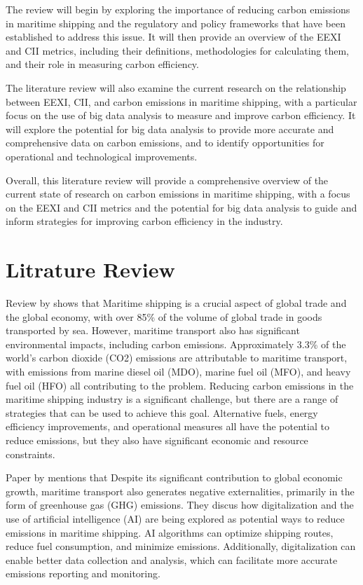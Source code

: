 The review will begin by exploring the importance of reducing carbon emissions in maritime shipping and the regulatory and policy frameworks that have been established to address this issue. It will then provide an overview of the EEXI and CII metrics, including their definitions, methodologies for calculating them, and their role in measuring carbon efficiency.

The literature review will also examine the current research on the relationship between EEXI, CII, and carbon emissions in maritime shipping, with a particular focus on the use of big data analysis to measure and improve carbon efficiency. It will explore the potential for big data analysis to provide more accurate and comprehensive data on carbon emissions, and to identify opportunities for operational and technological improvements.

Overall, this literature review will provide a comprehensive overview of the current state of research on carbon emissions in maritime shipping, with a focus on the EEXI and CII metrics and the potential for big data analysis to guide and inform strategies for improving carbon efficiency in the industry.


\section{Litrature Review}


Review by \cite{en15217910} shows that Maritime shipping is a crucial aspect of global trade and the global economy, with over 85\% of the volume of global trade in goods transported by sea.
However, maritime transport also has significant environmental impacts, including carbon emissions.
Approximately 3.3\% of the world's carbon dioxide (CO2) emissions are attributable to maritime transport, with emissions from marine diesel oil (MDO), marine fuel oil (MFO), and heavy fuel oil (HFO) all contributing to the problem.
Reducing carbon emissions in the maritime shipping industry is a significant challenge, but there are a range of strategies that can be used to achieve this goal.
Alternative fuels, energy efficiency improvements, and operational measures all have the potential to reduce emissions, but they also have significant economic and resource constraints.


Paper by \cite{en15176150} mentions that  Despite its significant contribution to global economic growth, maritime transport also generates negative externalities, primarily in the form of greenhouse gas (GHG) emissions.
They discus how digitalization and the use of artificial intelligence (AI) are being explored as potential ways to reduce emissions in maritime shipping.
AI algorithms can optimize shipping routes, reduce fuel consumption, and minimize emissions. Additionally, digitalization can enable better data collection and analysis, which can facilitate more accurate emissions reporting and monitoring.

